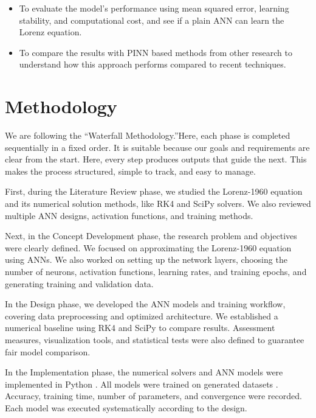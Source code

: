 \begin{itemize}
    \item To evaluate the model’s performance using mean squared error, learning stability, and computational cost, and see if a plain ANN can learn the Lorenz equation.
\end{itemize}

\begin{itemize}
    \item To compare the results with PINN based methods from other research to understand how this approach performs compared to recent techniques.
\end{itemize}


\section{Methodology}
We are following the “Waterfall Methodology.”Here, each phase is completed sequentially in a fixed order. It is suitable because our goals and requirements are clear from the start. Here, every step produces outputs that guide the next. This makes the process structured, simple to track, and easy to manage.

 First, during the Literature Review phase, we studied the Lorenz-1960 equation and its numerical solution methods, like RK4 and SciPy solvers. We also reviewed multiple ANN designs, activation functions, and training methods. 
 
  
  Next, in the Concept Development phase, the research problem and objectives were clearly defined. We focused on approximating the Lorenz-1960 equation using ANNs. We also worked on setting up the network layers, choosing the number of neurons, activation functions, learning rates, and training epochs, and generating training and validation data.
  
   
   In the Design phase, we developed the ANN models and training workflow, covering data preprocessing and optimized architecture. We established a numerical baseline using RK4 and SciPy to compare results. Assessment measures, visualization tools, and statistical tests were also defined to guarantee fair model comparison.
   
    
    In the Implementation phase, the numerical solvers and ANN models were implemented in Python . All models were trained on generated datasets . Accuracy, training time, number of parameters, and convergence were recorded. Each model was executed systematically according to the design.
    
